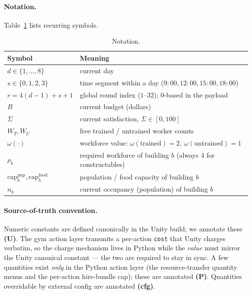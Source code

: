 \documentclass[11pt]{article}
\newcommand{\code}[1]{\texttt{\small #1}}
\newcommand{\Round}{r}
\newcommand{\Day}{d}
\newcommand{\seg}{s}
\begin{document}
\paragraph{Notation.} Table~\ref{tab:notation} lists recurring symbols.

\begin{table}[h]
\centering
\small
\begin{tabular}{@{}ll@{}}
\toprule
Symbol & Meaning \\
\midrule
$\Day \in \{1,\dots,8\}$ & current day \\
$\seg \in \{0,1,2,3\}$ & time segment within a day ($9{:}00,12{:}00,15{:}00,18{:}00$) \\
$\Round = 4(\Day-1)+\seg+1$ & global round index ($1$--$32$); $0$-based in the payload \\
$B$ & current budget (dollars) \\
$\Sigma$ & current satisfaction, $\Sigma \in [0,100]$ \\
$W_T, W_U$ & free trained / untrained worker counts \\
$\omega(\cdot)$ & workforce value: $\omega(\text{trained})=2,\ \omega(\text{untrained})=1$ \\
$\rho_b$ & required workforce of building $b$ (always $4$ for constructables) \\
$\mathrm{cap}_b^{\text{pop}}, \mathrm{cap}_b^{\text{food}}$ & population / food capacity of building $b$ \\
$n_b$ & current occupancy (population) of building $b$ \\
\bottomrule
\end{tabular}
\caption{Notation.}
\label{tab:notation}
\end{table}

\paragraph{Source-of-truth convention.} Numeric constants are defined
canonically in the Unity build; we annotate these \textbf{(U)}. The gym action
layer transmits a per-action \code{cost} that Unity charges verbatim, so the
charge mechanism lives in Python while the \emph{value} must mirror the Unity
canonical constant --- the two are required to stay in sync. A few quantities
exist \emph{only} in the Python action layer (the resource-transfer quantity
menus and the per-action hire-bundle cap); these are annotated \textbf{(P)}.
Quantities overridable by external config are annotated \textbf{(cfg)}.
\end{document}
